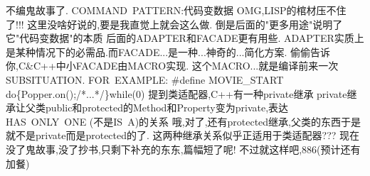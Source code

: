 \documentclass{ctexart}
\def\enter{{\hfill\break}}
\begin{document}
不编鬼故事了.\enter
COMMAND\ PATTERN:代码变数据\enter
OMG,LISP的棺材压不住了!!!\enter
这里没啥好说的,要是我直觉上就会这么做.\enter
倒是后面的"更多用途"说明了它"代码变数据"的本质\enter
\enter
后面的ADAPTER和FACADE更有用些.\enter
ADAPTER实质上是某种情况下的必需品.而FACADE...是一种...神奇的...简化方案.\enter
\enter
偷偷告诉你,C\&C++中小FACADE由MACRO实现.\enter
这个MACRO...就是编译前来一次SUBSITUATION.\enter
FOR\ EXAMPLE:\enter
{\#define MOVIE\_START do\{Popper.on();/*...*/\}while(0)}\enter
\enter
提到类适配器,C++有一种private继承\enter
private继承让父类public和protected的Method和Property变为private,表达HAS\ ONLY\ ONE  (不是IS\ A)的关系\enter
哦,对了,还有protected继承,父类的东西于是就不是private而是protected的了.\enter
这两种继承关系似乎正适用于类适配器???\enter
现在没了鬼故事,没了抄书,只剩下补充的东东,篇幅短了呢!\enter
不过就这样吧,886(预计还有加餐)\enter

\end{document}
